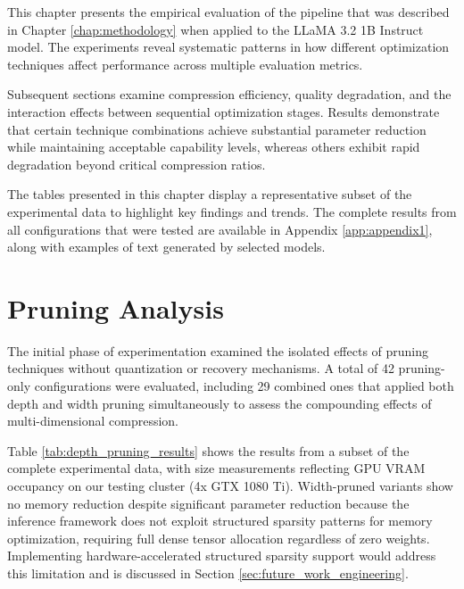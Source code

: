 

This chapter presents the empirical evaluation of the pipeline that was described in Chapter \ref{chap:methodology} when applied to the LLaMA 3.2 1B Instruct model. The experiments reveal systematic patterns in how different optimization techniques affect performance across multiple evaluation metrics.

Subsequent sections examine compression efficiency, quality degradation, and the interaction effects between sequential optimization stages. Results demonstrate that certain technique combinations achieve substantial parameter reduction while maintaining acceptable capability levels, whereas others exhibit rapid degradation beyond critical compression ratios.

The tables presented in this chapter display a representative subset of the experimental data to highlight key findings and trends. The complete results from all configurations that were tested are available in Appendix \ref{app:appendix1}, along with examples of text generated by selected models.

\section{Pruning Analysis}

The initial phase of experimentation examined the isolated effects of pruning techniques without quantization or recovery mechanisms. A total of 42 pruning-only configurations were evaluated, including 29 combined ones that applied both depth and width pruning simultaneously to assess the compounding effects of multi-dimensional compression.

Table \ref{tab:depth_pruning_results} shows the results from a subset of the complete experimental data, with size measurements reflecting GPU VRAM occupancy on our testing cluster (4x GTX 1080 Ti). Width-pruned variants show no memory reduction despite significant parameter reduction because the inference framework does not exploit structured sparsity patterns for memory optimization, requiring full dense tensor allocation regardless of zero weights. Implementing hardware-accelerated structured sparsity support would address this limitation and is discussed in Section \ref{sec:future_work_engineering}.

